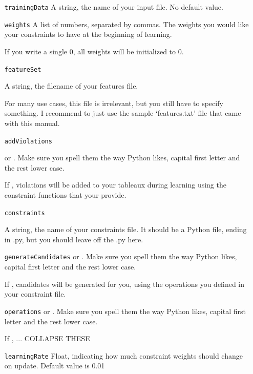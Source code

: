 \documentclass[12]{article}
\begin{document}
\begin{itemize}
	\item[\texttt{trainingData}] 
	A string, the name of your input file.  No default value.
	
	\item[\texttt{weights}] A list of numbers, separated by commas.  The weights you would like your constraints to have at the beginning of learning.
	
	If you write a single 0, all weights will be initialized to 0.
	
	\item[\texttt{featureSet}]
	
	A string, the filename of your features file.
	
	For many use cases, this file is irrelevant, but you still have to specify something.  I recommend to just use the sample `features.txt' file that came with this manual.
	
	\item[\texttt{addViolations}]
	
	 or .  Make sure you spell them the way Python likes, capital first letter and the rest lower case.
	
	If , violations will be added to your tableaux during learning using the constraint functions that your provide.
	
	\item[\texttt{constraints}]
	
	A string, the name of your constraints file.  It should be a Python file, ending in .py, but you should leave off the .py here.
	
	\item[\texttt{generateCandidates}]
	 or .  Make sure you spell them the way Python likes, capital first letter and the rest lower case.
	
	If , candidates will be generated for you, using the operations you defined in your constraint file.
	
	\item[\texttt{operations}]  	 or .  Make sure you spell them the way Python likes, capital first letter and the rest lower case.
	
	If , ...  COLLAPSE THESE
	
	\item[\texttt{learningRate}] Float, indicating how much constraint weights should change on update.  Default value is 0.01
	

\end{itemize}
\end{document}
